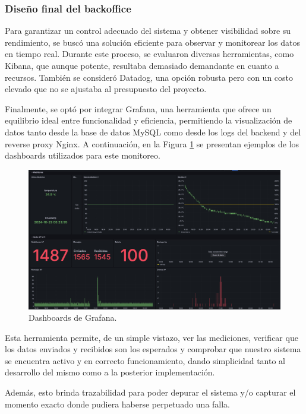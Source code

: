 \subsubsection{Diseño final del backoffice}

Para garantizar un control adecuado del sistema y obtener visibilidad sobre su rendimiento, se buscó una solución eficiente para observar y monitorear los datos en tiempo real. Durante este proceso, se evaluaron diversas herramientas, como Kibana, que aunque potente, resultaba demasiado demandante en cuanto a recursos. También se consideró Datadog, una opción robusta pero con un costo elevado que no se ajustaba al presupuesto del proyecto.

Finalmente, se optó por integrar Grafana, una herramienta que ofrece un equilibrio ideal entre funcionalidad y eficiencia, permitiendo la visualización de datos tanto desde la base de datos MySQL como desde los logs del backend y del reverse proxy Nginx. A continuación, en la Figura \ref{fig:grafana-dashboard} se presentan ejemplos de los dashboards utilizados para este monitoreo.

\begin{figure}[H]
	\centering
	\includegraphics[scale=.3]{./Figures/PortalWeb/Grafana-dashboard.jpeg}
	\caption{Dashboards de Grafana.}
	\label{fig:grafana-dashboard}
\end{figure}

Esta herramienta permite, de un simple vistazo, ver las mediciones, verificar que los datos enviados y recibidos son los esperados y comprobar que nuestro sistema se encuentra activo y en correcto funcionamiento, dando simplicidad tanto al desarrollo del mismo como a la posterior implementación. 

Además, esto brinda trazabilidad para poder depurar el sistema y/o capturar el momento exacto donde pudiera haberse perpetuado una falla. 





